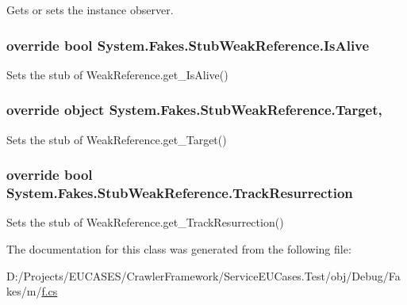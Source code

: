 Gets or sets the instance observer.

\hypertarget{class_system_1_1_fakes_1_1_stub_weak_reference_a5d903b837b56f157bd3b81c3a1dfd91e}{
\subsubsection[{Is\-Alive}]{\setlength{\rightskip}{0pt plus 5cm}override bool System.\-Fakes.\-Stub\-Weak\-Reference.\-Is\-Alive\hspace{0.3cm}{\ttfamily [get]}}}\label{class_system_1_1_fakes_1_1_stub_weak_reference_a5d903b837b56f157bd3b81c3a1dfd91e}


Sets the stub of Weak\-Reference.\-get\-\_\-\-Is\-Alive()

\hypertarget{class_system_1_1_fakes_1_1_stub_weak_reference_a14eb3a1284e00ba40449b5547601c7f5}{
\subsubsection[{Target}]{\setlength{\rightskip}{0pt plus 5cm}override object System.\-Fakes.\-Stub\-Weak\-Reference.\-Target\hspace{0.3cm}{\ttfamily [get]}, {\ttfamily [set]}}}\label{class_system_1_1_fakes_1_1_stub_weak_reference_a14eb3a1284e00ba40449b5547601c7f5}


Sets the stub of Weak\-Reference.\-get\-\_\-\-Target()

\hypertarget{class_system_1_1_fakes_1_1_stub_weak_reference_ac20726f9e6406f778281d604de3d8085}{
\subsubsection[{Track\-Resurrection}]{\setlength{\rightskip}{0pt plus 5cm}override bool System.\-Fakes.\-Stub\-Weak\-Reference.\-Track\-Resurrection\hspace{0.3cm}{\ttfamily [get]}}}\label{class_system_1_1_fakes_1_1_stub_weak_reference_ac20726f9e6406f778281d604de3d8085}


Sets the stub of Weak\-Reference.\-get\-\_\-\-Track\-Resurrection()



The documentation for this class was generated from the following file\-:\begin{DoxyCompactItemize}
\item 
D\-:/\-Projects/\-E\-U\-C\-A\-S\-E\-S/\-Crawler\-Framework/\-Service\-E\-U\-Cases.\-Test/obj/\-Debug/\-Fakes/m/\hyperlink{m_2f_8cs}{f.\-cs}\end{DoxyCompactItemize}
